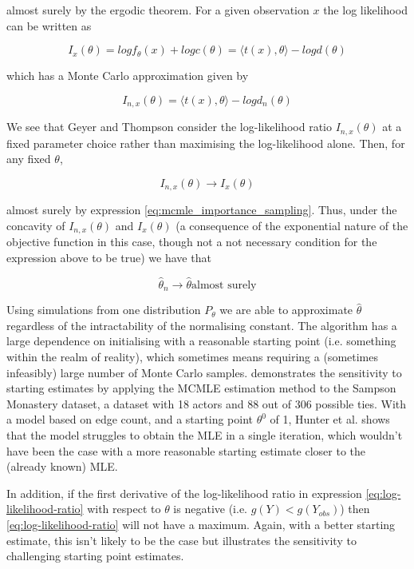 almost surely by the ergodic theorem. For a given observation $x$ the log likelihood can be written as

\begin{equation}
I_x(\theta) = log{f_\theta(x)} + log{c(\theta)} = \langle t(x), \theta \rangle - log{d(\theta)}
\end{equation}

which has a Monte Carlo approximation given by 

\begin{equation}
\label{eq:log-likelihood-ratio}
I_{n,x}(\theta) = \langle t(x), \theta \rangle - log{d_n(\theta)}
\end{equation}

We see that Geyer and Thompson consider the log-likelihood ratio $I_{n,x}(\theta)$ at a fixed parameter choice rather than maximising the log-likelihood alone. Then, for any fixed $\theta$,

\begin{equation}
I_{n,x}(\theta) \rightarrow I_x(\theta)
\end{equation}

almost surely by expression \ref{eq:mcmle_importance_sampling}. Thus, under the concavity of $I_{n,x}(\theta)$ and $I_x(\theta)$ (a consequence of the exponential nature of the objective function in this case, though not a not necessary condition for the expression above to be true) we have that 

\begin{equation}
\hat{\theta}_n \rightarrow \hat{\theta} \text{almost surely}
\end{equation}

Using simulations from one distribution $P_\theta$ we are able to approximate $\hat{\theta}$ regardless of the intractability of the normalising constant. The algorithm has a large dependence on initialising with a reasonable starting point (i.e. something within the realm of reality), which sometimes means requiring a (sometimes infeasibly) large number of Monte Carlo samples. \cite{ergm} demonstrates the sensitivity to starting estimates by applying the MCMLE estimation method to the Sampson Monastery dataset, a dataset with 18 actors and 88 out of 306 possible ties. With a model based on edge count, and a starting point $\theta^0$ of 1, Hunter et al. shows that the model struggles to obtain the MLE in a single iteration, which wouldn't have been the case with a more reasonable starting estimate closer to the (already known) MLE. 

In addition, if the first derivative of the log-likelihood ratio in expression \ref{eq:log-likelihood-ratio} with respect to $\theta$ is negative (i.e. $g(Y) < g(Y_{obs})$) then \ref{eq:log-likelihood-ratio} will not have a maximum. Again, with a better starting estimate, this isn't likely to be the case but illustrates the sensitivity to challenging starting point estimates.

